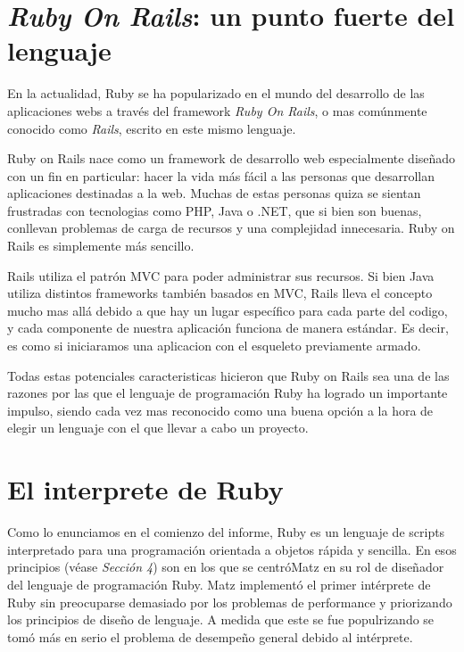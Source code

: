 \documentclass{article}
\begin{document}
\section{\textit{Ruby On Rails}: un punto fuerte del lenguaje}

	En la actualidad, Ruby se ha popularizado en el mundo del desarrollo de las aplicaciones webs a través del framework \textit{Ruby On Rails}, o mas comúnmente conocido como \textit{Rails}, escrito en este mismo lenguaje.
	\par
	Ruby on Rails nace como un framework de desarrollo web especialmente diseñado con un fin en particular: hacer la vida más fácil a las personas que desarrollan aplicaciones destinadas a la web. Muchas de estas personas quiza se sientan frustradas con tecnologias como PHP, Java o .NET, que si bien son buenas, conllevan problemas de carga de recursos y una complejidad innecesaria. Ruby on Rails es simplemente más sencillo.
	\par
	Rails utiliza el patrón MVC para poder administrar sus recursos. Si bien Java utiliza distintos frameworks también basados en MVC, Rails lleva el concepto mucho mas allá debido a que hay un lugar específico para cada parte del codigo, y cada componente de nuestra aplicación funciona de manera estándar. Es decir, es como si iniciaramos una aplicacion con el esqueleto previamente armado.
	\par
	Todas estas potenciales caracteristicas hicieron que Ruby on Rails sea una de las razones por las que el lenguaje de programación Ruby ha logrado un importante impulso, siendo cada vez mas reconocido como una buena opción a la hora de elegir un lenguaje con el que llevar a cabo un proyecto.
\bigskip




\section{El interprete de Ruby}

Como lo enunciamos en el comienzo del informe, Ruby es un lenguaje de scripts interpretado para una programación orientada a objetos rápida y sencilla. En esos principios (véase \textit{Sección 4}) son en los que se centró\newpage Matz en su rol de diseñador del lenguaje de programación Ruby. Matz implementó el primer intérprete de Ruby sin preocuparse demasiado por los problemas de performance y priorizando los principios de diseño de lenguaje. A medida que este se fue populrizando se tomó más en serio el problema de desempeño general debido al intérprete.
\bigskip
\end{document}
